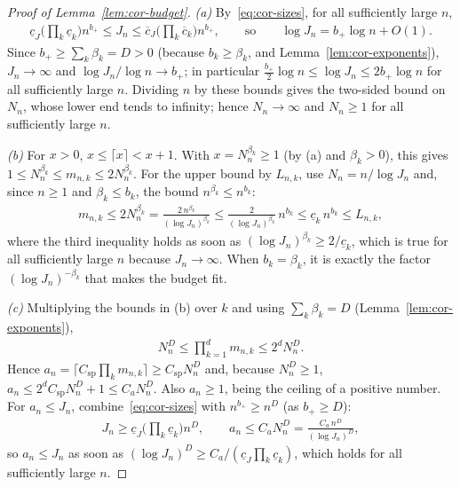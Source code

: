 \begin{proof}[Proof of Lemma~\ref{lem:cor-budget}]
\emph{(a)} By~\eqref{eq:cor-sizes}, for all sufficiently large $n$,
\begin{align*}
\underline c_J\Big(\prod_k\underline c_k\Big)n^{b_+}\leq J_n\leq\overline c_J\Big(\prod_k\overline c_k\Big)n^{b_+},
\qquad\text{so}\qquad
\log J_n=b_+\log n+O(1).
\end{align*}
Since $b_+\geq\sum_k\beta_k=D>0$ (because $b_k\geq\beta_k$, and Lemma~\ref{lem:cor-exponents}), $J_n\to\infty$ and $\log J_n/\log n\to b_+$; in particular $\tfrac{b_+}2\log n\leq\log J_n\leq2b_+\log n$ for all sufficiently large $n$. Dividing $n$ by these bounds gives the two-sided bound on $N_n$, whose lower end tends to infinity; hence $N_n\to\infty$ and $N_n\geq1$ for all sufficiently large $n$.

\emph{(b)} For $x>0$, $x\leq\lceil x\rceil<x+1$. With $x=N_n^{\beta_k}\geq1$ (by (a) and $\beta_k>0$), this gives $1\leq N_n^{\beta_k}\leq m_{n,k}\leq2N_n^{\beta_k}$. For the upper bound by $L_{n,k}$, use $N_n=n/\log J_n$ and, since $n\geq1$ and $\beta_k\leq b_k$, the bound $n^{\beta_k}\leq n^{b_k}$:
\begin{align*}
m_{n,k}\leq2N_n^{\beta_k}=\frac{2\,n^{\beta_k}}{(\log J_n)^{\beta_k}}\leq\frac{2}{(\log J_n)^{\beta_k}}\,n^{b_k}\leq\underline c_k\,n^{b_k}\leq L_{n,k},
\end{align*}
where the third inequality holds as soon as $(\log J_n)^{\beta_k}\geq2/\underline c_k$, which is true for all sufficiently large $n$ because $J_n\to\infty$. When $b_k=\beta_k$, it is exactly the factor $(\log J_n)^{-\beta_k}$ that makes the budget fit.

\emph{(c)} Multiplying the bounds in (b) over $k$ and using $\sum_k\beta_k=D$ (Lemma~\ref{lem:cor-exponents}),
\begin{align*}
N_n^D\leq\prod_{k=1}^dm_{n,k}\leq2^dN_n^D.
\end{align*}
Hence $a_n=\lceil C_{\mathrm{sp}}\prod_km_{n,k}\rceil\geq C_{\mathrm{sp}}N_n^D$ and, because $N_n^D\geq1$, $a_n\leq2^dC_{\mathrm{sp}}N_n^D+1\leq C_aN_n^D$. Also $a_n\geq1$, being the ceiling of a positive number. For $a_n\leq J_n$, combine~\eqref{eq:cor-sizes} with $n^{b_+}\geq n^D$ (as $b_+\geq D$):
\begin{align*}
J_n\geq\underline c_J\Big(\prod_k\underline c_k\Big)n^D,
\qquad
a_n\leq C_aN_n^D=\frac{C_a\,n^D}{(\log J_n)^D},
\end{align*}
so $a_n\leq J_n$ as soon as $(\log J_n)^D\geq C_a/(\underline c_J\prod_k\underline c_k)$, which holds for all sufficiently large $n$.
\end{proof}

